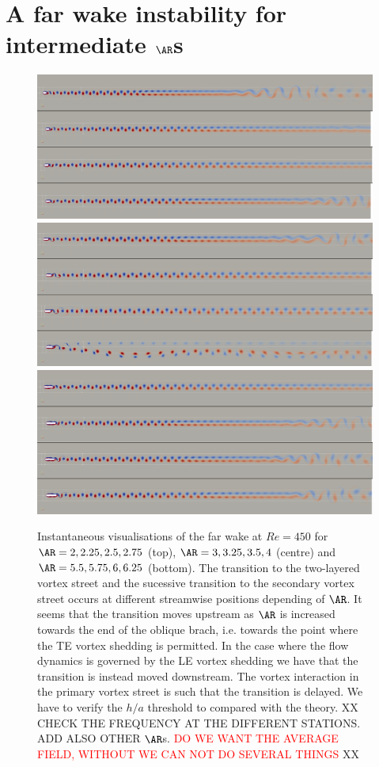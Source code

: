 \section{A far wake instability for intermediate $\AR$s}
\label{sec:farwake}

\begin{figure}  
  \includegraphics[width=\textwidth]{./fig/appendix/AR_2_2p75_Re450.png}
  \includegraphics[width=\textwidth]{./fig/appendix/AR_3_4_Re450.png}
  \includegraphics[width=\textwidth]{./fig/appendix/AR_5p5_6p25_Re450.png}    
  \caption{Instantaneous visualisations of the far wake at $Re=450$ for $\AR=2,2.25,2.5,2.75$ (top), $\AR= 3, 3.25, 3.5, 4$ (centre) and $\AR=5.5,5.75,6,6.25$ (bottom). The transition to the two-layered vortex street and the sucessive transition to the secondary vortex street occurs at different streamwise positions depending of $\AR$. It seems that the transition moves upstream as $\AR$ is increased towards the end of the oblique brach, i.e. towards the point where the TE vortex shedding is permitted. In the case where the flow dynamics is governed by the LE vortex shedding we have that the transition is instead moved downstream. The vortex interaction in the primary vortex street is such that the transition is delayed. We have to verify the $h/a$ threshold to compared with the theory. XX CHECK THE FREQUENCY AT THE DIFFERENT STATIONS. ADD ALSO OTHER $\AR$s. \textcolor{red}{DO WE WANT THE AVERAGE FIELD, WITHOUT WE CAN NOT DO SEVERAL THINGS} XX}
  \label{fig:wake}
\end{figure}

